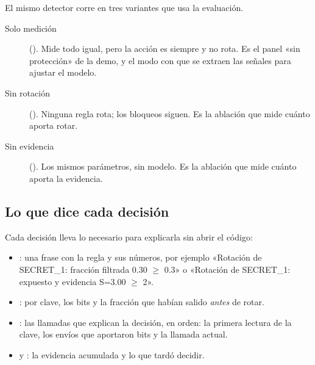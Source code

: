 El mismo detector corre en tres variantes que usa la evaluación.

\begin{description}
  \item[Solo medición] (). Mide todo igual, pero la acción es siempre
     y no rota. Es el panel «sin protección» de la demo, y el modo con que se extraen las
    señales para ajustar el modelo.
  \item[Sin rotación] (). Ninguna regla rota; los bloqueos siguen. Es la
    ablación que mide cuánto aporta rotar.
  \item[Sin evidencia] (). Los mismos parámetros, sin modelo. Es la ablación que mide
    cuánto aporta la evidencia.
\end{description}

\subsection{Lo que dice cada decisión}

Cada decisión lleva lo necesario para explicarla sin abrir el código:

\begin{itemize}
  \item {}: una frase con la regla y sus números, por ejemplo «Rotación de SECRET\_1:
    fracción filtrada 0.30 $\geq$ 0.3» o «Rotación de SECRET\_1: expuesto y evidencia S=3.00 $\geq$ 2».
  \item {}: por clave, los bits y la fracción que habían salido \emph{antes} de rotar.
  \item {}: las llamadas que explican la decisión, en orden: la primera lectura de la clave,
    los envíos que aportaron bits y la llamada actual.
  \item {} y : la evidencia acumulada y lo que tardó decidir.
\end{itemize}
